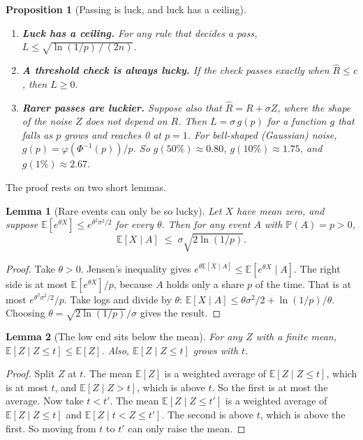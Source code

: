 \documentclass[11pt]{article}
\theoremstyle{plain}
\newtheorem{proposition}{Proposition}
\newtheorem{lemma}{Lemma}
\theoremstyle{definition}
\renewcommand{\Pr}{\mathbb{P}}
\newcommand{\E}{\mathbb{E}}
\begin{document}
\begin{proposition}[Passing is luck, and luck has a ceiling]
\label{prop:luck}
\leavevmode
\begin{enumerate}[label=(\alph*),leftmargin=1.6em]
    \item \textbf{Luck has a ceiling.} For any rule that decides a pass, $L \le \sqrt{\ln(1/p) \,/\, (2n)}$.
    \item \textbf{A threshold check is always lucky.} If the check passes exactly when $\hat R \le c$, then $L \ge 0$.
    \item \textbf{Rarer passes are luckier.} Suppose also that $\hat R = R + \sigma Z$, where the shape of the noise $Z$ does not depend on $R$. Then $L = \sigma\, g(p)$ for a function $g$ that falls as $p$ grows and reaches 0 at $p = 1$. For bell-shaped (Gaussian) noise, $g(p) = \varphi(\Phi^{-1}(p))/p$. So $g(50\%) \approx 0.80$, $g(10\%) \approx 1.75$, and $g(1\%) \approx 2.67$.
\end{enumerate}
\end{proposition}

The proof rests on two short lemmas.

\begin{lemma}[Rare events can only be so lucky]
\label{lem:ceiling}
Let $X$ have mean zero, and suppose $\E[e^{\theta X}] \le e^{\theta^2\sigma^2/2}$ for every $\theta$. Then for any event $A$ with $\Pr(A) = p > 0$,
\[
\E[X \mid A] \;\le\; \sigma\sqrt{2\ln(1/p)}.
\]
\end{lemma}

\begin{proof}
Take $\theta > 0$. Jensen's inequality gives $e^{\theta\E[X \mid A]} \le \E[e^{\theta X} \mid A]$. The right side is at most $\E[e^{\theta X}]/p$, because $A$ holds only a share $p$ of the time. That is at most $e^{\theta^2\sigma^2/2}/p$. Take logs and divide by $\theta$: $\E[X \mid A] \le \theta\sigma^2/2 + \ln(1/p)/\theta$. Choosing $\theta = \sqrt{2\ln(1/p)}/\sigma$ gives the result.
\end{proof}

\begin{lemma}[The low end sits below the mean]
\label{lem:tail}
For any $Z$ with a finite mean, $\E[Z \mid Z \le t] \le \E[Z]$. Also, $\E[Z \mid Z \le t]$ grows with $t$.
\end{lemma}

\begin{proof}
Split $Z$ at $t$. The mean $\E[Z]$ is a weighted average of $\E[Z \mid Z \le t]$, which is at most $t$, and $\E[Z \mid Z > t]$, which is above $t$. So the first is at most the average. Now take $t < t'$. The mean $\E[Z \mid Z \le t']$ is a weighted average of $\E[Z \mid Z \le t]$ and $\E[Z \mid t < Z \le t']$. The second is above $t$, which is above the first. So moving from $t$ to $t'$ can only raise the mean.
\end{proof}
\end{document}
